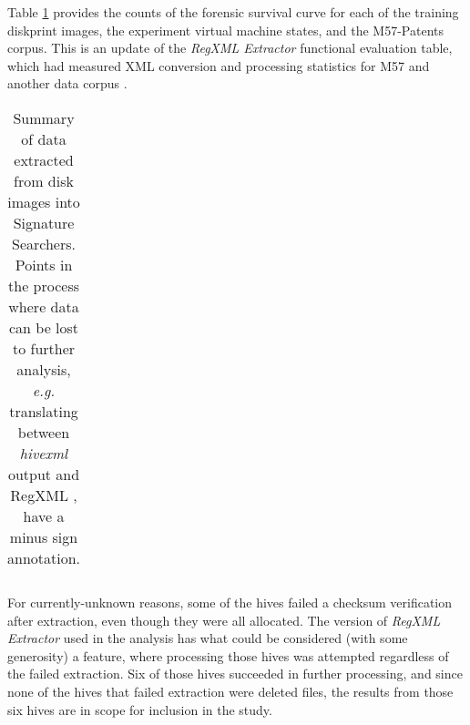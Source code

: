 \documentclass[11pt]{ucthesis}
\theoremstyle{plain}
\theoremstyle{definition}
\newcommand{\eg}{\emph{e.g.}\xspace}
\newcommand{\hivexml}{\emph{hivexml}\xspace}
\newcommand{\Regxmlextractor}{\emph{RegXML Extractor}\xspace}
\begin{document}
Table \ref{tbl:rxstats:all} provides the counts of the forensic survival curve for each of the training diskprint images, the experiment virtual machine states, and the M57-Patents corpus.  This is an update of the \Regxmlextractor functional evaluation table, which had measured XML conversion and processing statistics for M57 and another data corpus \cite[Table 2]{nelson:ifip12}.

\begin{table}[htp]
\caption{\label{tbl:rxstats:all}Summary of data extracted from disk images into Signature Searchers.  Points in the process where data can be lost to further analysis, \eg translating between \hivexml output and RegXML \cite{nelson:ifip12}, have a minus sign annotation.}
\begin{center}
\begin{small}
\begin{tabular}{lrrr}
\toprule

\bottomrule
\end{tabular}
\end{small}
\end{center}
\end{table}

For currently-unknown reasons, some of the hives failed a checksum verification after extraction, even though they were all allocated.  The version of \Regxmlextractor used in the analysis has what could be considered (with some generosity) a feature, where processing those hives was attempted regardless of the failed extraction.  Six of those hives succeeded in further processing, and since none of the hives that failed extraction were deleted files, the results from those six hives are in scope for inclusion in the study.
\end{document}
